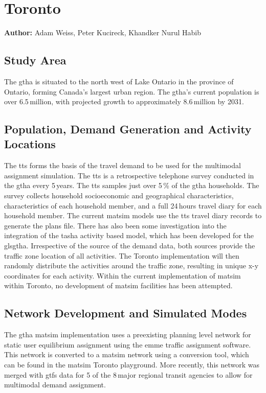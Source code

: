 \section{Toronto}
\label{sec:toronto}
\hfill \textbf{Author:} Adam Weiss, Peter Kucireck, Khandker Nurul Habib

\subsection{Study Area}
The \gls{gtha} is situated to the north west of Lake Ontario in the province of Ontario, forming Canada’s largest urban region. The \gls{gtha}’s current population is over 6.5\,million, with projected growth to approximately 8.6\,million by 2031. 

\subsection{Population, Demand Generation and Activity Locations}
The \gls{tts} forms the basis of the travel demand to be used for the \gls{multimodal} assignment simulation. The \gls{tts} is a retrospective telephone survey conducted in the \gls{gtha} every 5\,years. The \gls{tts} samples just over 5\,\% of the \gls{gtha} households. The survey collects household socioeconomic and geographical characteristics, characteristics of each household member, and a full 24\,hours travel diary for each household member. The current \gls{matsim} models use the \gls{tts} travel diary records to generate the plans file. There has also been some investigation into the integration of the \gls{tasha} activity based model, which has been developed for the gls{gtha}. Irrespective of the source of the demand data, both sources provide the traffic zone location of all activities. The Toronto implementation will then randomly distribute the activities around the traffic zone, resulting in unique x-y coordinates for each activity. Within the current implementation of \gls{matsim} within Toronto, no development of \gls{matsim} facilities has been attempted.

\subsection{Network Development and Simulated Modes}  
The \gls{gtha} \gls{matsim} implementation uses a preexisting planning level network for static user equilibrium assignment using the \gls{emme} traffic assignment software. This network is converted to a \gls{matsim} network using a conversion tool, which can be found in the \gls{matsim} Toronto playground. More recently, this network was merged with \gls{gtfs} data for 5 of the 8\,major regional transit agencies to allow for \gls{multimodal} demand assignment.  

